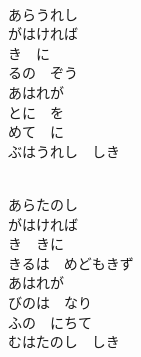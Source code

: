\documentclass[10pt,b5j]{tarticle} %
\begin{document}
\vspace{1.5em} %
\newcommand{\linespace}{0.5em} %
\newcommand{\blocksize}{0.5\hsize} %
\newcommand{\itemmargin}{6em} %
\begin{enumerate} %
    \setlength{\itemindent}{\itemmargin} %
    \begin{minipage}[c]{\blocksize}
    
        \vspace{\linespace}
        \item~\\
        あらうれし\\
        がはければ\\
        き　に\\
        るの　ぞう\\
        あはれが\\
        とに　を\\
        めて　に\\
        ぶはうれし　しき
        
        \vspace{\linespace}
        \item~\\
        あらたのし\\
        がはければ\\
        き　きに\\
        きるは　めどもきず\\
        あはれが\\
        びのは　なり\\
        ふの　にちて\\
        むはたのし　しき
    
    \end{minipage}
\end{enumerate} %
\end{document}
